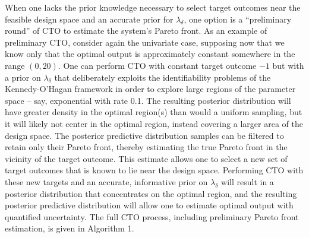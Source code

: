 \documentclass[12pt]{article}
\begin{document}
%
When one lacks the prior knowledge necessary to select target outcomes near the feasible design space and an accurate prior for $\lambda_\delta$, one option is a ``preliminary round'' of CTO to estimate the system's Pareto front.
%
As an example of preliminary CTO, consider again the univariate case, supposing now that we know only that the optimal output is approximately constant somewhere in the range $(0,20)$. 
%
%
%
%
One can perform CTO with constant target outcome $-1$ but with a prior on $\lambda_\delta$ that deliberately exploits the identifiability problems of the Kennedy-O'Hagan framework in order to explore large regions of the parameter space -- say, exponential with rate 0.1.
% 
The resulting posterior distribution will have greater density in the optimal region(s) than would a uniform sampling, but it will likely not center in the optimal region, instead covering a larger area of the design space.
The posterior predictive distribution samples can be filtered to retain only their Pareto front, thereby estimating the true Pareto front in the vicinity of the target outcome.
%
%
This estimate allows one to select a new set of target outcomes that is known to lie near the design space.
%
Performing CTO with these new targets and an accurate, informative prior on $\lambda_\delta$ will result in a posterior distribution that concentrates on the optimal region, and the resulting posterior predictive distribution will allow one to estimate optimal output with quantified uncertainty.
%
%
%
The full CTO process, including preliminary Pareto front estimation, is given in Algorithm 1.
\end{document}
